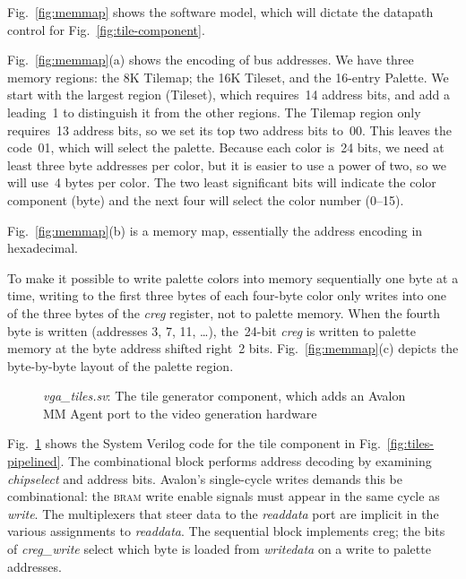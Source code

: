 \documentclass[11pt]{article}
\newcommand{\figref}[1]{Fig.~\ref{fig:#1}}
\begin{document}
\figref{memmap} shows the software model, which will dictate the
datapath control for \figref{tile-component}.

\figref{memmap}(a) shows the encoding of bus addresses.  We have three
memory regions: the 8K Tilemap; the 16K Tileset, and the 16-entry
Palette.  We start with the largest region (Tileset), which
requires~14 address bits, and add a leading~1 to distinguish it from
the other regions.  The Tilemap region only requires~13 address bits,
so we set its top two address bits to~00.  This leaves the code~01,
which will select the palette.  Because each color is~24 bits, we need
at least three byte addresses per color, but it is easier to use a
power of two, so we will use~4 bytes per color.  The two least
significant bits will indicate the color component (byte) and the next
four will select the color number (0--15).

\figref{memmap}(b) is a memory map, essentially the address encoding
in hexadecimal.

To make it possible to write palette colors into memory sequentially
one byte at a time, writing to the first three bytes of each four-byte
color only writes into one of the three bytes of the \emph{creg}
register, not to palette memory.  When the fourth byte is written
(addresses 3, 7, 11, \ldots), the~24-bit \emph{creg} is written to
palette memory at the byte address shifted right~2 bits.
\figref{memmap}(c) depicts the byte-by-byte layout of the palette
region.

\begin{figure}
  
  \vspace{-\baselineskip}
  \caption{\emph{vga\_tiles.sv}: The tile generator component, which adds
    an Avalon MM Agent port to the video generation hardware}
  \label{fig:vga-tiles}
\end{figure}

\figref{vga-tiles} shows the System Verilog code for the tile
component in \figref{tiles-pipelined}.  The combinational block
performs address decoding by examining \emph{chipselect} and address
bits.  Avalon's single-cycle writes demands this be combinational: the
\textsc{bram} write enable signals must appear in the same cycle as
\emph{write}.  The multiplexers that steer data to the \emph{readdata}
port are implicit in the various assignments to
\emph{readdata}.  The sequential block implements creg; the bits of
\emph{creg\_write} select which byte is loaded from \emph{writedata}
on a write to palette addresses.
\end{document}
